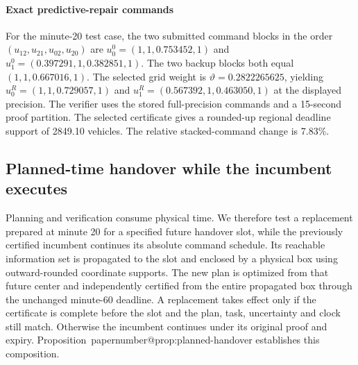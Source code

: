 \documentclass[preprint,12pt]{elsarticle}
\makeatletter
\numberwithin{equation}{section}
\newcommand{\papernumber}[1]{\csname papernumber@#1\endcsname}
\makeatother
\begin{document}
\paragraph{Exact predictive-repair commands}
For the minute-20 test case, the two submitted command blocks in the order
$(u_{12},u_{21},u_{02},u_{20})$ are
$u_0^0=(1,1,0.753452,1)$ and
$u_1^0=(0.397291,1,0.382851,1)$.
The two backup blocks both equal $(1,1,0.667016,1)$.
The selected grid weight is $\vartheta=0.2822265625$, yielding
$u_0^R=(1,1,0.729057,1)$ and
$u_1^R=(0.567392,1,0.463050,1)$ at the displayed precision.
The verifier uses the stored full-precision commands and a 15-second proof
partition. The selected certificate gives a rounded-up regional deadline
support of 2849.10 vehicles. The relative stacked-command change is 7.83\%.

\subsection{Planned-time handover while the incumbent executes}
\label{supp:detail:sec:delayed-handover-results}

Planning and verification consume physical time. We therefore test a
replacement prepared at minute 20 for a specified future handover slot,
while the previously certified incumbent continues its absolute command
schedule. Its reachable information set is propagated to the slot and
enclosed by a physical box using outward-rounded coordinate supports.
The new plan is optimized from that future center and independently
certified from the entire propagated box through the unchanged minute-60
deadline. A replacement takes effect only if the certificate is complete
before the slot and the plan, task, uncertainty and clock still match.
Otherwise the incumbent continues under its original proof and expiry.
Proposition~\papernumber{prop:planned-handover} establishes this composition.
\end{document}
